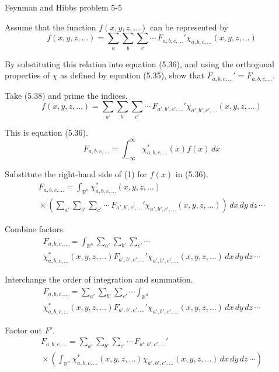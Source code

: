 \documentclass[12pt]{article}
\begin{document}
\begin{center}
Feynman and Hibbs problem 5-5
\end{center}

Assume that the function $f(x,y,z,\ldots)$ can be represented by
\begin{equation*}
f(x,y,z,\ldots)=\sum_a\sum_b\sum_c\cdots\,F_{a,b,c,\ldots}'\chi_{a,b,c,\ldots}(x,y,z,\ldots)
\tag{5.38}
\end{equation*}

By substituting this relation into equation (5.36), and using the
orthogonal properties of $\chi$ as defined by equation (5.35),
show that $F_{a,b,c,\ldots}'=F_{a,b,c,\ldots}$.

\bigskip
Take (5.38) and prime the indices.
\begin{equation*}
f(x,y,z,\ldots)=\sum_{a'}\sum_{b'}\sum_{c'}\cdots\,F_{a',b',c',\ldots}'\chi_{a',b',c',\ldots}(x,y,z,\ldots)
\tag{1}
\end{equation*}

This is equation (5.36).
\begin{equation*}
F_{a,b,c,\ldots}=\int_{-\infty}^\infty \chi_{a,b,c,\ldots}^*(x)f(x)\,dx
\tag{5.36}
\end{equation*}

Substitute the right-hand side of (1) for $f(x)$ in (5.36).
\begin{multline*}
F_{a,b,c,\ldots}
=\int_{\mathbb R^n}\chi_{a,b,c,\ldots}^*(x,y,z,\ldots)
\\
{}\times\left(\sum_{a'}\sum_{b'}\sum_{c'}\cdots\,F_{a',b',c',\ldots}'\chi_{a',b',c',\ldots}(x,y,z,\ldots)\right)
\,dx\,dy\,dz\,\cdots
\end{multline*}

Combine factors.
\begin{multline*}
F_{a,b,c,\ldots}
=\int_{\mathbb R^n}
\sum_{a'}\sum_{b'}\sum_{c'}\cdots
\\
\chi_{a,b,c,\ldots}^*(x,y,z,\ldots)
F_{a',b',c',\ldots}'
\chi_{a',b',c',\ldots}(x,y,z,\ldots)
\,dx\,dy\,dz\,\cdots
\end{multline*}

Interchange the order of integration and summation.
\begin{multline*}
F_{a,b,c,\ldots}
=\sum_{a'}\sum_{b'}\sum_{c'}\cdots\int_{\mathbb R^n}
\\
\chi_{a,b,c,\ldots}^*(x,y,z,\ldots)
F_{a',b',c',\ldots}'
\chi_{a',b',c',\ldots}(x,y,z,\ldots)
\,dx\,dy\,dz\,\cdots
\end{multline*}

Factor out $F'$.
\begin{multline*}
F_{a,b,c,\ldots}
=\sum_{a'}\sum_{b'}\sum_{c'}\cdots\,F_{a',b',c',\ldots}'
\\
{}\times\left(
\int_{\mathbb R^n}
\chi_{a,b,c,\ldots}^*(x,y,z,\ldots)
\chi_{a',b',c',\ldots}(x,y,z,\ldots)
\,dx\,dy\,dz\,\cdots
\right)
\end{multline*}
\end{document}
